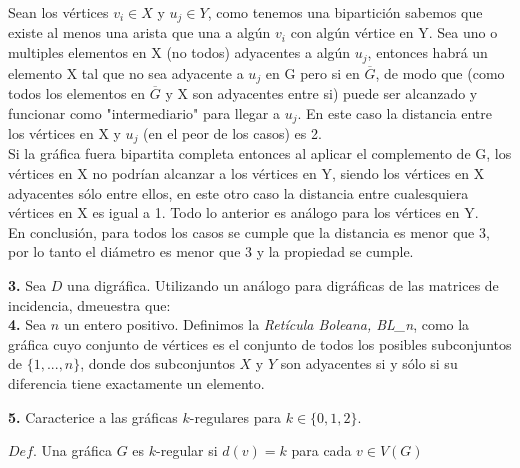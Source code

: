 \documentclass[12pt]{article}
\begin{document}
Sean los vértices $v_i \in X$ y $u_j \in Y$, como tenemos una bipartición sabemos que existe al menos una arista que una a algún $v_i$ con algún vértice en Y. Sea uno o multiples elementos en X (no todos) adyacentes a algún $u_j$, entonces habrá un elemento X  tal que no sea adyacente a $u_j$ en G pero si en $\overline{G}$, de modo que (como todos los elementos en $\overline{G}$ y X son adyacentes entre si) puede ser alcanzado y funcionar como "intermediario" para llegar a $u_j$. En este caso la distancia entre los vértices en X y $u_j$ (en el peor de los casos) es 2.\\

Si la gráfica fuera bipartita completa entonces al  aplicar el complemento de G, los vértices en X no podrían alcanzar a los vértices en Y, siendo los vértices en X adyacentes sólo entre ellos, en este otro caso la distancia entre cualesquiera vértices en X es igual a 1. Todo lo anterior es análogo para los vértices en Y.\\

En conclusión,  para todos los casos se cumple que la distancia es menor que 3, por lo tanto el diámetro es menor que 3 y la propiedad se cumple.\\

\vspace{1cm}

%
%
\textbf{3.} Sea $D$ una digráfica. Utilizando un análogo para digráficas de las matrices de incidencia, dmeuestra que:\\

\vspace{1cm}
%
%
\textbf{4.} Sea $n$ un entero positivo. Definimos la \textit{Retícula Boleana, BL\_n}, como
la gráfica cuyo conjunto de vértices es el conjunto de todos los posibles subconjuntos
de $\{1, ..., n\}$, donde dos subconjuntos $X$ y $Y$ son adyacentes si y sólo si su diferencia
tiene exactamente un elemento.\\

\vspace{1cm}

%
%
\textbf{5.} Caracterice a las gráficas $k$-regulares para $k \in \{0, 1, 2\}$.

\begin{tcolorbox}[title=\textbf{Definiciones}, colback=blue!15!white, colframe=black!]
    $Def$. Una gráfica $G$ es $k$-regular si $d(v) = k$ para cada $v \in V(G)$
\end{tcolorbox}
\end{document}
